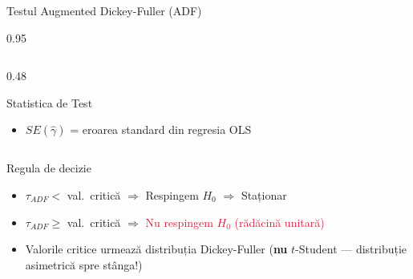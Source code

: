 \documentclass[9pt, aspectratio=169, t]{beamer}
\begin{document}
\begin{frame}{Testul Augmented Dickey-Fuller (ADF)}
\begin{cminipage}{0.95\textwidth}
{\begin{columns}[T]
\begin{column}{0.48\textwidth}
\begin{block}{Statistica de Test}
\begin{itemize}
                        \item $SE(\hat{\gamma})$ = eroarea standard din regresia OLS
                    \end{itemize}
                \end{block}
            \end{column}
        \end{columns}
        \vspace{-1mm}
        \begin{alertblock}{Regula de decizie}
            \begin{itemize}\setlength{\itemsep}{0pt}
                \item $\tau_{ADF} <$ val.\ critică $\Rightarrow$ Respingem $H_0$ $\Rightarrow$ \textcolor{Forest}{Staționar}
                \item $\tau_{ADF} \geq$ val.\ critică $\Rightarrow$ \textcolor{Crimson}{Nu respingem $H_0$ (rădăcină unitară)}
                \item Valorile critice urmează distribuția Dickey-Fuller (\textbf{nu} $t$-Student --- distribuție asimetrică spre stânga!)
            \end{itemize}
        \end{alertblock}
        }
    \end{cminipage}
\end{frame}
\end{document}
